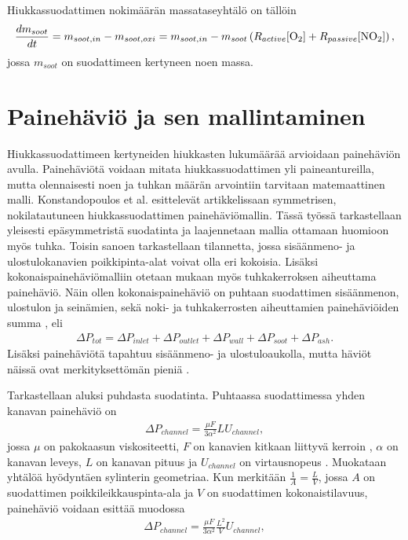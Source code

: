 Hiukkassuodattimen nokimäärän massataseyhtälö on tällöin
\begin{align}
    \frac{dm_{soot}}{dt} = m_{soot, in} - m_{soot, oxi}
    =m_{soot, in} - m_{soot} \left( R_{active}[\ce{O2}] + R_{passive}[\ce{NO2}] \right),
\end{align}
jossa \(m_{soot}\) on suodattimeen kertyneen noen massa.


\section{Painehäviö ja sen mallintaminen}
Hiukkassuodattimeen kertyneiden hiukkasten lukumäärää arvioidaan painehäviön avulla. Painehäviötä voidaan mitata hiukkassuodattimen yli paineantureilla, mutta olennaisesti noen ja tuhkan määrän arvointiin tarvitaan matemaattinen malli.
Konstandopoulos et al. esittelevät artikkelissaan \cite{Konstandopoulos2000} symmetrisen, nokilatautuneen hiukkassuodattimen painehäviömallin. Tässä työssä tarkastellaan yleisesti epäsymmetristä suodatinta ja laajennetaan mallia ottamaan huomioon myös tuhka. Toisin sanoen tarkastellaan tilannetta, jossa sisäänmeno- ja ulostulokanavien poikkipinta-alat voivat olla eri kokoisia. Lisäksi kokonaispainehäviömalliin otetaan mukaan myös tuhkakerroksen aiheuttama painehäviö. Näin ollen kokonaispainehäviö on puhtaan suodattimen sisäänmenon, ulostulon ja seinämien, sekä noki- ja tuhkakerrosten aiheuttamien painehäviöiden summa \cite{Konstandopoulos2000}\cite{Konstandopoulos2008}, eli
\begin{align}
    \Delta P_{tot} = \Delta P_{inlet} +  \Delta P_{outlet} + \Delta P_{wall} + \Delta P_{soot} +  \Delta P_{ash}.
\end{align}
Lisäksi painehäviötä tapahtuu sisäänmeno- ja ulostuloaukolla, mutta häviöt näissä ovat merkityksettömän pieniä \cite{Konstandopoulos2000}.

Tarkastellaan aluksi puhdasta suodatinta. Puhtaassa suodattimessa yhden kanavan painehäviö on
\begin{align}
    \Delta P_{channel} = \frac{\mu F}{3 \alpha^2} LU_{channel},
\end{align}
jossa \(\mu \) on pakokaasun viskositeetti, \(F\) on kanavien kitkaan liittyvä kerroin \cite{dieselnet_wall_flow_monolith}, \(\alpha\) on kanavan leveys, \(L\) on kanavan pituus ja \(U_{channel}\) on virtausnopeus \cite{Konstandopoulos2000}.
Muokataan yhtälöä hyödyntäen sylinterin geometriaa. Kun merkitään \(\frac{1}{A} = \frac{L}{V}\), jossa \(A\) on suodattimen poikkileikkauspinta-ala ja \(V\) on suodattimen kokonaistilavuus, painehäviö voidaan esittää muodossa
\begin{align}\label{eq:clean_channel_pd}
    \Delta P_{channel} = \frac{\mu F}{3 \alpha^2} \frac{L^2}{V}U_{channel},
\end{align}

